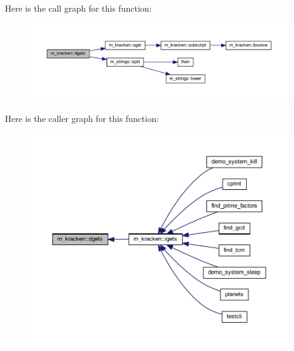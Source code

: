 Here is the call graph for this function\+:
\nopagebreak
\begin{figure}[H]
\begin{center}
\leavevmode
\includegraphics[width=350pt]{namespacem__kracken_a76e99048e7fb6010dcb7173ef958c932_cgraph}
\end{center}
\end{figure}
Here is the caller graph for this function\+:
\nopagebreak
\begin{figure}[H]
\begin{center}
\leavevmode
\includegraphics[width=350pt]{namespacem__kracken_a76e99048e7fb6010dcb7173ef958c932_icgraph}
\end{center}
\end{figure}
\mbox{\label{namespacem__kracken_a2cb376f8a8e26e489a45cafcda66ea3e}} 
